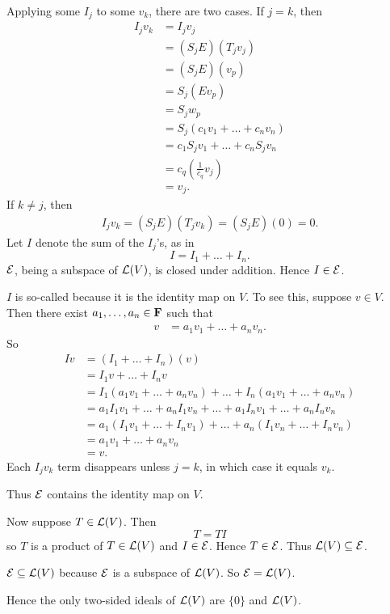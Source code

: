 \documentclass[a5paper]{article}
\begin{document}
    Applying some $I_j$ to some $v_k$, there are two cases.
    If $j=k$, then
\begin{align*}
        I_jv_k &= I_jv_j \\
               &= (S_jE)(T_jv_j) \\
                  &= (S_jE)(v_p)\\
                  &= S_j(Ev_p)\\
                  &= S_jw_p\\
                  &= S_j(c_1v_1+\dots+c_nv_n)\\
                  &= c_1S_jv_1+\dots+c_nS_jv_n\\
                  &= c_q\left(\frac{1}{c_q}v_j\right)\\
                  &= v_j.
\end{align*}
    If $k\neq j$, then
\begin{align*}
        I_jv_k = (S_jE)(T_jv_k) = (S_jE)(0) = 0 .
\end{align*}
    Let $I$ denote the sum of the $I_j$'s, as in
\begin{equation*}
        I = I_1 + \dots + I_n .
\end{equation*}
    $\mathcal{E}$, being a subspace of $\mathcal{L}(V)$, is closed under addition.
    Hence $I \in \mathcal{E}$.

    $I$ is so-called because it is the identity map on $V$.
    To see this, suppose $v \in V$.
    Then there exist $a_1,\dots,a_n \in \mathbf{F}$ such that
\begin{align*}
         v&=a_1v_1+\dots+a_nv_n .
\end{align*}
    So
\begin{align*}
        Iv &= (I_1+\dots+I_n)(v)\\
           &= I_1v + \dots + I_nv\\
           &= I_1(a_1v_1 + \dots + a_nv_n) + \dots + I_n(a_1v_1 + \dots + a_nv_n)\\
           &= a_1I_1v_1 + \dots + a_nI_1v_n + \dots + a_1I_nv_1 + \dots + a_nI_nv_n\\
           &= a_1(I_1v_1 + \dots + I_nv_1) + \dots + a_n(I_1v_n + \dots + I_nv_n)\\
           &= a_1v_1 + \dots + a_nv_n\\
           &= v .
\end{align*}
    Each $I_jv_k$ term disappears unless $j=k$, in which case it equals $v_k$.

    Thus $\mathcal{E}$ contains the identity map on $V$.

    Now suppose $T \in \mathcal{L}(V)$.
    Then
\begin{equation*}
        T = TI
\end{equation*}
    so $T$ is a product of $T \in \mathcal{L}(V)$ and $I \in \mathcal{E}$.
    Hence $T \in \mathcal{E}$.
    Thus $\mathcal{L}(V) \subseteq \mathcal{E}$.

    $\mathcal{E} \subseteq \mathcal{L}(V)$ because $\mathcal{E}$ is a subspace of $\mathcal{L}(V)$.
    So $\mathcal{E} = \mathcal{L}(V)$.

    Hence the only two-sided ideals of $\mathcal{L}(V)$ are $\{0\}$ and $\mathcal{L}(V)$.
\end{document}
